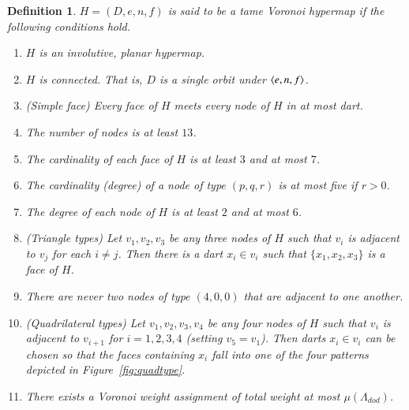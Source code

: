\documentclass{article} %
\newtheorem{definition}[lemma]{Definition}
\begin{document}
\begin{definition}
$H=(D,e,n,f)$ is said to be a tame Voronoi hypermap if the following conditions
hold.
\begin{enumerate}
\item $H$ is an involutive, planar hypermap.
\item $H$ is connected.  That is, $D$ is a single orbit under $\langle e,n,f\rangle$.
\item (Simple face) Every face of $H$ meets every node of $H$ in at most
dart.
\item The number of nodes is at least $13$.
\item The cardinality of each face of $H$ is at least $3$ and at most $7$.
\item The cardinality (degree) of a node of type $(p,q,r)$ is at most five if $r>0$.
\item The degree of each node of $H$ is at least $2$ and at most $6$.
\item (Triangle types) Let $v_1,v_2,v_3$ be any three nodes of $H$ such that $v_i$ is adjacent to $v_j$
for each $i\ne j$.  Then there is a dart $x_i\in v_i$ such that $\{x_1,x_2,x_3\}$ is
a face of $H$.
\item There are never two nodes of type $(4,0,0)$ that are adjacent to one another.
\item (Quadrilateral types) 
Let $v_1,v_2,v_3,v_4$ be any four nodes of $H$ such that $v_i$ is adjacent
to $v_{i+1}$ for $i=1,2,3,4$ (setting $v_5=v_1$).  Then darts $x_i\in v_i$ can be chosen
so that the faces containing $x_i$ fall into one of the four patterns depicted
in Figure~\ref{fig:quadtype}.
\item There exists a Voronoi weight assignment of total weight at most $\mu(\Lambda_{dod})$.
\end{enumerate}
\end{definition}

\begin{floatingfigure}{80mm}
  \begin{center}
   \end{center}
  \caption{}
\label{fig:quadtype}
\end{floatingfigure}



\end{document}
